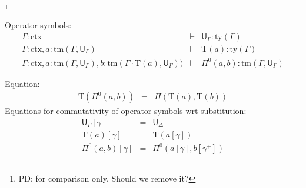 \documentclass[11pt,a4paper]{article}
\theoremstyle{definition}
\newcommand{\N}{\mathsf{N}}
\newcommand{\ctx}{\mathrm{ctx}}
\newcommand{\ty}{\mathrm{ty}}
\newcommand{\tm}{\mathrm{tm}}
\newcommand{\tuple}[1]{\langle #1 \rangle}
\def\p{\mathrm{p}}
\def\q{\mathrm{q}}
\def\U{\mathsf{U}}
\newcommand{\Ta}{\mathrm{T}}
\begin{document}
\footnote{PD: for comparison only. Should we remove it?}
\begin{tiny}
Operator symbols:
\begin{eqnarray*}
\Gamma : \ctx &\vdash& \U_\Gamma : \ty(\Gamma)\\
\Gamma : \ctx, a : \tm(\Gamma,\U_\Gamma) &\vdash& {\Ta}(a) : \ty(\Gamma)\\
\Gamma : \ctx,
a : \tm(\Gamma,\U_\Gamma),
b :  \tm(\Gamma \cdot \Ta(a), \U_\Gamma))
&\vdash&
 \Pi^0(a,b) : \tm(\Gamma,\U_\Gamma)
\end{eqnarray*}

Equation:
\begin{eqnarray*}
\Ta(\Pi^0(a,b)) &=& \Pi(\Ta(a),\Ta(b))
\end{eqnarray*}
 Equations for commutativity of operator symbols wrt substitution:
 \begin{eqnarray*}
{\U}_\Gamma [ \gamma ] &=& {\U}_\Delta\\
\Ta(a) [ \gamma ] &=& \Ta(a[ \gamma ] )\\
\Pi^0(a,b)[ \gamma ] &=& \Pi^0(a [ \gamma ], b[ \gamma^+ ])
\end{eqnarray*}
\end{tiny}


\end{document}
